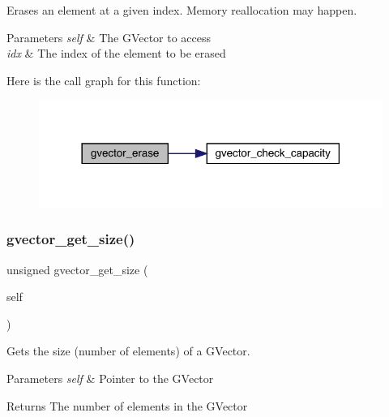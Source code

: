 Erases an element at a given index. Memory reallocation may happen. 


\begin{DoxyParams}{Parameters}
{\em self} & The G\+Vector to access \\
\hline
{\em idx} & The index of the element to be erased \\
\hline
\end{DoxyParams}
Here is the call graph for this function\+:\nopagebreak
\begin{figure}[H]
\begin{center}
\leavevmode
\includegraphics[width=318pt]{group___g_vector_ga7efdee3a454559bde23b23f31d40b4db_cgraph}
\end{center}
\end{figure}
\hypertarget{group___g_vector_ga3570990e6e22e8bd76cceec25869e117}{}\label{group___g_vector_ga3570990e6e22e8bd76cceec25869e117} 
\subsubsection{\texorpdfstring{gvector\+\_\+get\+\_\+size()}{gvector\_get\_size()}}
{\footnotesize\ttfamily unsigned gvector\+\_\+get\+\_\+size (\begin{DoxyParamCaption}\item[{\hyperlink{group___g_vector_ga6d90d5e6b721779a43354f2752b79281}{G\+Vector} $\ast$}]{self }\end{DoxyParamCaption})}



Gets the size (number of elements) of a G\+Vector. 


\begin{DoxyParams}{Parameters}
{\em self} & Pointer to the G\+Vector\\
\hline
\end{DoxyParams}
\begin{DoxyReturn}{Returns}
The number of elements in the G\+Vector 
\end{DoxyReturn}
\hypertarget{group___g_vector_ga6fd765130f11b97b8fcca59d7c4e98d1}{}\label{group___g_vector_ga6fd765130f11b97b8fcca59d7c4e98d1} 
